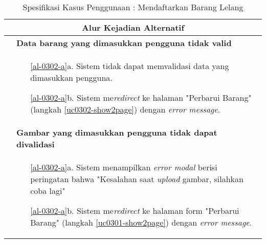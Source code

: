 \begin{table}[H]
\begin{tabular}{|r|p{8cm}|}
		\multicolumn{2}{|c|}{\textbf{Alur Kejadian Alternatif}}                                                         \\ \hline
		\multicolumn{1}{|l|}{}                                           & \textbf{Data barang yang dimasukkan pengguna tidak valid}
			\\ \hline
		\multicolumn{1}{|l|}{}                                           & 
			 \begin{itemize}
			 	\item[\ref{al-0302-a}a.] Sistem tidak dapat memvalidasi data yang dimasukkan pengguna.
			 	\item[\ref{al-0302-a}b.] Sistem me\textit{redirect} ke halaman "Perbarui Barang" (langkah \ref{uc0302-show2page}) dengan \textit{error message}.
			 \end{itemize}
		 \\ \hline
		 \multicolumn{1}{|l|}{}                                           & \textbf{Gambar yang dimasukkan pengguna tidak dapat divalidasi}
		 \\ \hline
		 \multicolumn{1}{|l|}{}                                           & 
		 \begin{itemize}
		 	\item[\ref{al-0302-a}a.] Sistem menampilkan \textit{error modal} berisi peringatan bahwa "Kesalahan saat \textit{upload} gambar, silahkan coba lagi"
		 	\item[\ref{al-0302-a}b.] Sistem me\textit{redirect} ke halaman form "Perbarui Barang" (langkah \ref{uc0301-show2page}) dengan \textit{error message}.
		 \end{itemize}
		 \\ \hline
	\end{tabular}
	\caption{Spesifikasi Kasus Penggunaan : Mendaftarkan Barang Lelang}
	\label{uc03.02-tab}
\end{table}